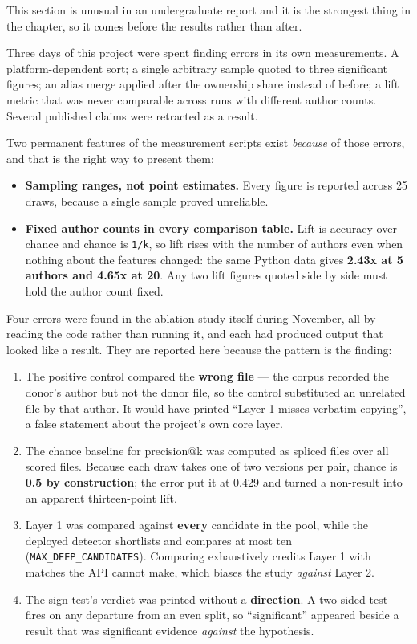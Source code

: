 This section is unusual in an undergraduate report and it is the
strongest thing in the chapter, so it comes before the results rather
than after.

Three days of this project were spent finding errors in its own
measurements. A platform-dependent sort; a single arbitrary sample
quoted to three significant figures; an alias merge applied after the
ownership share instead of before; a lift metric that was never
comparable across runs with different author counts. Several published
claims were retracted as a result.

Two permanent features of the measurement scripts exist \emph{because}
of those errors, and that is the right way to present them:

\begin{itemize}
\tightlist
\item
  \textbf{Sampling ranges, not point estimates.} Every figure is
  reported across 25 draws, because a single sample proved unreliable.
\item
  \textbf{Fixed author counts in every comparison table.} Lift is
  accuracy over chance and chance is \texttt{1/k}, so lift rises with
  the number of authors even when nothing about the features changed:
  the same Python data gives \textbf{2.43x at 5 authors and 4.65x at
  20}. Any two lift figures quoted side by side must hold the author
  count fixed.
\end{itemize}

Four errors were found in the ablation study itself during November, all
by reading the code rather than running it, and each had produced output
that looked like a result. They are reported here because the pattern is
the finding:

\begin{enumerate}
\def\labelenumi{\arabic{enumi}.}
\tightlist
\item
  The positive control compared the \textbf{wrong file} --- the corpus
  recorded the donor's author but not the donor file, so the control
  substituted an unrelated file by that author. It would have printed
  ``Layer 1 misses verbatim copying'', a false statement about the
  project's own core layer.
\item
  The chance baseline for precision@k was computed as spliced files over
  all scored files. Because each draw takes one of two versions per
  pair, chance is \textbf{0.5 by construction}; the error put it at
  0.429 and turned a non-result into an apparent thirteen-point lift.
\item
  Layer 1 was compared against \textbf{every} candidate in the pool,
  while the deployed detector shortlists and compares at most ten
  (\texttt{MAX\_DEEP\_CANDIDATES}). Comparing exhaustively credits Layer
  1 with matches the API cannot make, which biases the study
  \emph{against} Layer 2.
\item
  The sign test's verdict was printed without a \textbf{direction}. A
  two-sided test fires on any departure from an even split, so
  ``significant'' appeared beside a result that was significant evidence
  \emph{against} the hypothesis.
\end{enumerate}

